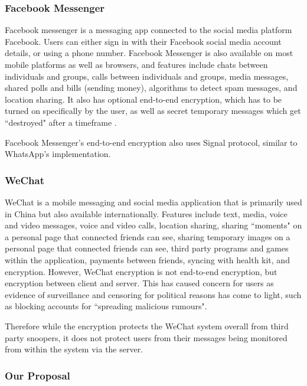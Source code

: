 \subsubsection{Facebook Messenger}

Facebook messenger is a messaging app connected to the social media platform Facebook. Users can either sign in with their Facebook social media account details, or using a phone number\cite{fb-phone}. Facebook Messenger is also available on most mobile platforms as well as browsers, and features include chats between individuals and groups, calls between individuals and groups, media messages, shared polls and bills (sending money), algorithms to detect spam messages, and location sharing\cite{fb-features}. It also has optional end-to-end encryption, which has to be turned on specifically by the user, as well as secret temporary messages which get ``destroyed" after a timeframe \cite{fb-encryption}.

Facebook Messenger's end-to-end encryption also uses Signal protocol, similar to WhatsApp's implementation\cite{fb-security}.

\subsubsection{WeChat}

WeChat is a mobile messaging and social media application that is primarily used in China but also available internationally. Features include text, media, voice and video messages, voice and video calls, location sharing, sharing ``moments" on a personal page that connected friends can see, sharing temporary images on a personal page that connected friends can see, third party programs and games within the application, payments between friends, syncing with health kit, and encryption\cite{wechat-applestore}. However, WeChat encryption is not end-to-end encryption, but encryption between client and server\cite{wechat-security}. This has caused concern for users as evidence of surveillance and censoring for political reasons has come to light, such as blocking accounts for ``spreading malicious rumours"\cite{wechat-surveillance}.

Therefore while the encryption protects the WeChat system overall from third party snoopers, it does not protect users from their messages being monitored from within the system via the server. 

\subsubsection{Our Proposal}

